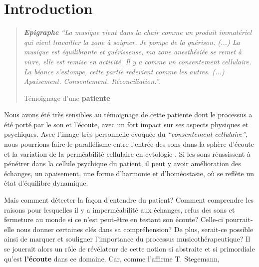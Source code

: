 

\chapter{Introduction}



\begin{quotation}
 \textit{\textbf{Epigraphe  }   ``La musique vient dans la chair comme un produit immatériel
 qui vient travailler la zone à soigner. Je pompe de la
 guérison.
 (...)
 La musique est équilibrante et guérisseuse, ma zone
 anesthésiée se remet à vivre, elle est remise en activité.
 Il y a comme un consentement cellulaire.
La béance s'estompe, cette
partie redevient comme les autres. (...)
Apaisement. Consentement. Réconciliation.''.}

Témoignage d'une\textbf{
patiente}

\end{quotation}

Nous avons été très sensibles au témoignage de cette patiente dont le
processus a été porté par le son et l'écoute, avec un fort impact
sur ses aspects physiques
et psychiques.
Avec l'image très personnelle évoquée du
\textit{``consentement cellulaire''}, nous pourrions faire le
parallélisme entre l'entrée des sons dans la sphère d'écoute et la variation de la
perméabilité cellulaire en cytologie \autocite[ch. 3 pp. 70--76]{marieb:biologie}. Si les sons réussissent à pénétrer dans la
cellule psychique du patient, il peut y avoir amélioration des
échanges, un apaisement, une forme d'harmonie et d'homéostasie,  \autocite[ch. 1
p. 10]{marieb:biologie} où se reflète un état d'équilibre dynamique.

Mais comment détecter la façon d'entendre du patient?
Comment comprendre les raisons pour lesquelles il y a imperméabilité
aux
échanges, refus des sons et fermeture au monde si ce n'est
peut-être  en testant
son écoute?  Celle-ci pourrait-elle nous donner certaines clés dans sa
compréhension?
De plus, serait-ce possible ainsi
de marquer et souligner l'importance du processus musicothérapeutique?
Il se jouerait alors un
rôle de
révélateur de cette notion si abstraite et si primordiale qu'est
\textbf{l'écoute} dans ce domaine. Car, comme l'affirme T. Stegemann,

